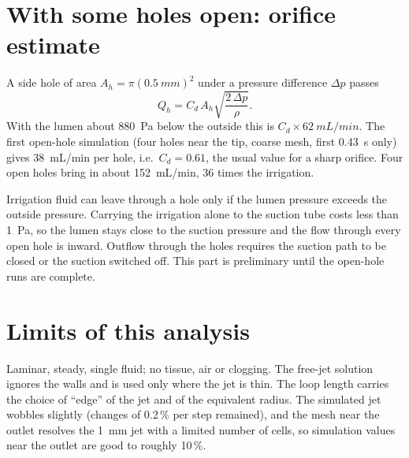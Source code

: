 \documentclass[10pt,a4paper]{article}
\begin{document}
\section{With some holes open: orifice estimate}
A side hole of area $A_h=\pi(\SI{0.5}{mm})^2$ under a pressure difference $\Delta p$ passes
\begin{equation}
Q_h=C_d\,A_h\sqrt{\frac{2\,\Delta p}{\rho}} .
\end{equation}
With the lumen about \SI{880}{Pa} below the outside this is $C_d\times\SI{62}{mL/min}$. The first open-hole
simulation (four holes near the tip, coarse mesh, first \SI{0.43}{s} only) gives \SI{38}{mL/min} per hole,
i.e.\ $C_d=0.61$, the usual value for a sharp orifice. Four open holes bring in about
\SI{152}{mL/min}, 36 times the irrigation.

Irrigation fluid can leave through a hole only if the lumen pressure exceeds the outside pressure. Carrying
the irrigation alone to the suction tube costs less than \SI{1}{Pa}, so the lumen stays close to the suction
pressure and the flow through every open hole is inward. Outflow through the holes requires the suction path
to be closed or the suction switched off. This part is preliminary until the open-hole runs are complete.

\section{Limits of this analysis}
Laminar, steady, single fluid; no tissue, air or clogging. The free-jet solution ignores the walls and is
used only where the jet is thin. The loop length carries the choice of ``edge'' of the jet and of the
equivalent radius. The simulated jet wobbles slightly (changes of 0.2\,\% per step remained), and the mesh
near the outlet resolves the \SI{1}{mm} jet with a limited number of cells, so simulation values near the
outlet are good to roughly 10\,\%.
\end{document}
